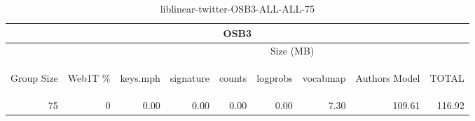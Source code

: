 \begin{center}
\begin{table}[htbp]
\begin{tabular}{ | r | r | r | r | r | r | r | r | r |}
\hline
\multicolumn{9}{|c|}{OSB3}\\
\hline
 & & \multicolumn{7}{|c|}{Size (MB)}\\ \cline{3-9}
\begin{sideways}Group Size\end{sideways} & \begin{sideways}Web1T \% \end{sideways} & \begin{sideways}keys.mph\end{sideways} & \begin{sideways}signature\end{sideways} & \begin{sideways}counts\end{sideways} & \begin{sideways}logprobs\end{sideways} & \begin{sideways}vocabmap\end{sideways} & \begin{sideways}Authors Model \end{sideways} & \begin{sideways}TOTAL\end{sideways}\\
\hline
\multirow{0}{*}{75}
 & 0 & 0.00 & 0.00 & 0.00 & 0.00 & 7.30 & 109.61 & 116.92\\ \cline{2-9}
\hline
\end{tabular}
\caption{liblinear-twitter-OSB3-ALL-ALL-75}
\label{table:liblinear-twitter-OSB3-ALL-ALL-75}
\end{table}
\end{center}

